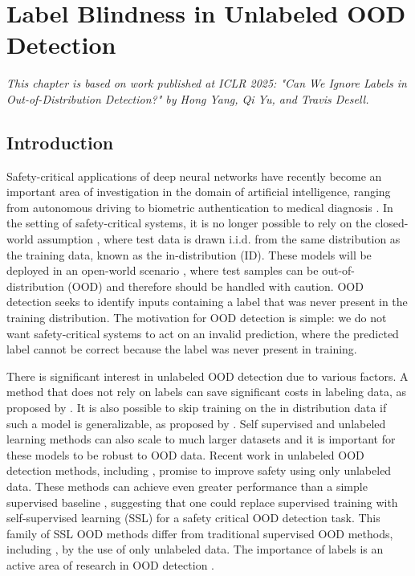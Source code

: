 \documentclass[11pt, oneside]{book}
\theoremstyle{plain}
\theoremstyle{definition}
\theoremstyle{remark}
\begin{document}
\chapter{Label Blindness in Unlabeled OOD Detection}

\textit{This chapter is based on work published at ICLR 2025: "Can We Ignore Labels in Out-of-Distribution Detection?" by Hong Yang, Qi Yu, and Travis Desell.}

\section{Introduction}

Safety-critical applications of deep neural networks have recently become an important area of investigation in the domain of artificial intelligence, ranging from autonomous driving \citep{ramanagopal2018failing} to biometric authentication \citep{wang2021deep} to medical diagnosis \citep{bakator2018deep}. In the setting of safety-critical systems, it is no longer possible to rely on the closed-world assumption \citep{krizhevsky2012imagenet}, where test data is drawn i.i.d. from the same distribution as the training data, known as the in-distribution (ID). These models will be deployed in an open-world scenario \citep{drummond2006open}, where test samples can be out-of-distribution (OOD) and therefore should be handled with caution. OOD detection seeks to identify inputs containing a label that was never present in the training distribution. The motivation for OOD detection is simple: we do not want safety-critical systems to act on an invalid prediction, where the predicted label cannot be correct because the label was never present in training.

There is significant interest in unlabeled OOD detection due to various factors. A method that does not rely on labels can save significant costs in labeling data, as proposed by \citet{sehwag2021ssd}. It is also possible to skip training on the in distribution data if such a model is generalizable, as proposed by \citet{wang2023clipn}. Self supervised and unlabeled learning methods can also scale to much larger datasets and it is important for these models to be robust to OOD data. Recent work in unlabeled OOD detection methods, including \citet{sehwag2021ssd, tack2020csi, liu2023unsupervised, guille2024cadet, wang2023clipn}, promise to improve safety using only unlabeled data. These methods can achieve even greater performance than a simple supervised baseline \citep{hendrycks2016baseline}, suggesting that one could replace supervised training with self-supervised learning (SSL) for a safety critical OOD detection task. This family of SSL OOD methods differ from traditional supervised OOD methods, including \citet{fort2021exploring}, by the use of only unlabeled data. The importance of labels is an active area of research in OOD detection \citep{du2024does, du2024and}.
\end{document}
